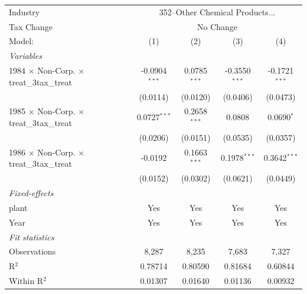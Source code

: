 \documentclass[
  12pt]{article}
\theoremstyle{definition}
\theoremstyle{remark}
\begin{document}
\begin{table}
\begin{minipage}{\linewidth}
\begin{tabular}{lcccc}
   Industry & \multicolumn{4}{c}{352–Other Chemical Products...} \\ 
   Tax Change & \multicolumn{4}{c}{No Change} \\ 
   Model:                                                  & (1)                    & (2)                  & (3)                 & (4)\\  
   \midrule
   \emph{Variables}\\
   1984 $\times$ Non-Corp. $\times$ treat\_3tax\_treat     & -0.0904$^{***}$        & 0.0785$^{***}$       & -0.3550$^{***}$     & -0.1721$^{***}$\\   
                                                           & (0.0114)               & (0.0120)             & (0.0406)            & (0.0473)\\   
   1985 $\times$ Non-Corp. $\times$ treat\_3tax\_treat     & 0.0727$^{***}$         & 0.2658$^{***}$       & 0.0808              & 0.0690$^{*}$\\   
                                                           & (0.0206)               & (0.0151)             & (0.0535)            & (0.0357)\\   
   1986 $\times$ Non-Corp. $\times$ treat\_3tax\_treat     & -0.0192                & 0.1663$^{***}$       & 0.1978$^{***}$      & 0.3642$^{***}$\\   
                                                           & (0.0152)               & (0.0302)             & (0.0621)            & (0.0449)\\   
   \midrule
   \emph{Fixed-effects}\\
   plant                                                   & Yes                    & Yes                  & Yes                 & Yes\\  
   Year                                                    & Yes                    & Yes                  & Yes                 & Yes\\  
   \midrule
   \emph{Fit statistics}\\
   Observations                                            & 8,287                  & 8,235                & 7,683               & 7,327\\  
   R$^2$                                                   & 0.78714                & 0.80590              & 0.81684             & 0.60844\\  
   Within R$^2$                                            & 0.01307                & 0.01640              & 0.01136             & 0.00932\\  

\end{tabular}
\end{minipage}
\end{table}
\end{document}
